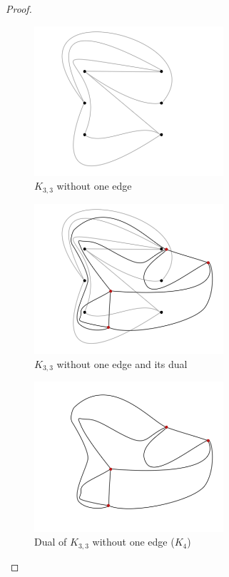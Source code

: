\begin{proof}
    \begin{figure}[H]
        \begin{center}
        \includegraphics[width=7cm]{Test2/Problem9/PlanarK3_3WithoutOneEdge.png}
        \end{center}                            
        \caption{$K_{3,3}$ without one edge}
        \label{t2:p9_PlanarK3_3WithoutOneEdge.png}                        
    \end{figure}\pn    
    
    \begin{figure}[H]
        \begin{center}
        \includegraphics[width=7cm]{Test2/Problem9/PlanarK3_3WithoutOneEdge_and_dual.png}
        \end{center}                            
        \caption{$K_{3,3}$ without one edge and its dual}
        \label{t2:p9_PlanarK3_3WithoutOneEdge_and_dual.png}                        
    \end{figure}\pn    
    
    \begin{figure}[H]
        \begin{center}
        \includegraphics[width=7cm]{Test2/Problem9/PlanarK3_3WithoutOneEdge_dual.png}
        \end{center}                            
        \caption{Dual of $K_{3,3}$ without one edge ($K_4$)}
        \label{t2:p9_PlanarK3_3WithoutOneEdge_dual.png}                        
    \end{figure}\pn
\end{proof}